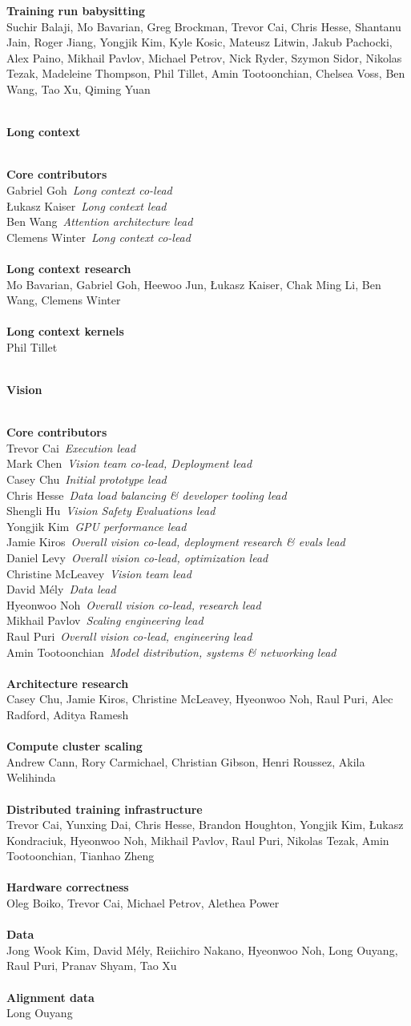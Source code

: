 \documentclass{article}
\newcommand{\creditsectionheader}[1]{\parbox{\columnwidth}{\centering \textbf{\small #1}}\\}
\newcommand{\creditlistheader}[1]{\textbf{#1}\footnotemark[\thefootnote]\\}
\newcommand{\creditlist}[2]{\creditlistheader{#1}#2\\
\\}
\newcommand{\corecontributor}[2]{#1\ \textit{#2}\\}
\begin{document}
\begin{multicols}{2}
\creditlist{Training run babysitting}{
Suchir Balaji, Mo Bavarian, Greg Brockman, Trevor Cai, Chris Hesse, Shantanu Jain, Roger Jiang, Yongjik Kim, Kyle Kosic, Mateusz Litwin, Jakub Pachocki, Alex Paino, Mikhail Pavlov, Michael Petrov, Nick Ryder, Szymon Sidor, Nikolas Tezak, Madeleine Thompson, Phil Tillet, Amin Tootoonchian, Chelsea Voss, Ben Wang, Tao Xu, Qiming Yuan}
\creditsectionheader{Long context}
\creditlistheader{Core contributors}
\corecontributor{Gabriel Goh}{Long context co-lead}
\corecontributor{\L{}ukasz Kaiser}{Long context lead}
\corecontributor{Ben Wang}{Attention architecture lead}
\corecontributor{Clemens Winter}{Long context co-lead}
\\
\creditlist{Long context research}{Mo Bavarian, Gabriel Goh, Heewoo Jun, \L{}ukasz Kaiser, Chak Ming Li, Ben Wang, Clemens Winter}
\creditlist{Long context kernels}{Phil Tillet}
\creditsectionheader{Vision}
\creditlistheader{Core contributors}
\corecontributor{Trevor Cai}{Execution lead}
\corecontributor{Mark Chen}{Vision team co-lead, Deployment lead}
\corecontributor{Casey Chu}{Initial prototype lead}
\corecontributor{Chris Hesse}{Data load balancing \& developer tooling lead}
\corecontributor{Shengli Hu}{Vision Safety Evaluations lead}
\corecontributor{Yongjik Kim}{GPU performance lead}
\corecontributor{Jamie Kiros}{Overall vision co-lead, deployment research \& evals lead}
\corecontributor{Daniel Levy}{Overall vision co-lead, optimization lead}
\corecontributor{Christine McLeavey}{Vision team lead}
\corecontributor{David M\'ely}{Data lead}
\corecontributor{Hyeonwoo Noh}{Overall vision co-lead, research lead}
\corecontributor{Mikhail Pavlov}{Scaling engineering lead}
\corecontributor{Raul Puri}{Overall vision co-lead, engineering lead}
\corecontributor{Amin Tootoonchian}{Model distribution, systems \& networking lead}
\\
\creditlist{Architecture research}{Casey Chu, Jamie Kiros, Christine McLeavey, Hyeonwoo Noh, Raul Puri, Alec Radford, Aditya Ramesh}
\creditlist{Compute cluster scaling}{Andrew Cann, Rory Carmichael, Christian Gibson, Henri Roussez, Akila Welihinda}
\creditlist{Distributed training infrastructure}{Trevor Cai, Yunxing Dai, Chris Hesse, Brandon Houghton, Yongjik Kim, \L{}ukasz Kondraciuk, Hyeonwoo Noh, Mikhail Pavlov, Raul Puri, Nikolas Tezak, Amin Tootoonchian, Tianhao Zheng}
\creditlist{Hardware correctness}{Oleg Boiko, Trevor Cai, Michael Petrov, Alethea Power}
\creditlist{Data}{Jong Wook Kim, David M\'ely, Reiichiro Nakano, Hyeonwoo Noh, Long Ouyang, Raul Puri, Pranav Shyam, Tao Xu}
\creditlist{Alignment data}{Long Ouyang}

\end{multicols}
\end{document}
